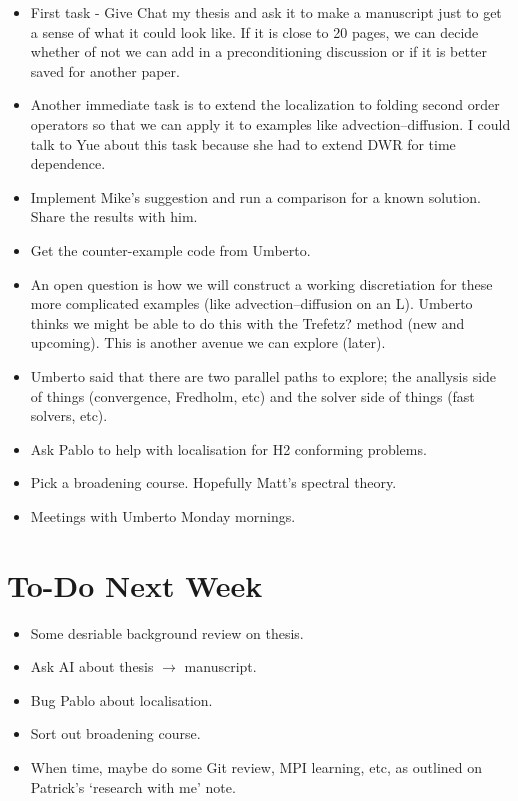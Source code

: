 \documentclass[12pt,a4paper]{article}
\begin{document}
\begin{itemize}
    \item First task - Give Chat my thesis and ask it to make a manuscript just to get a sense of what it could look like. If it is close to 20 pages, we can decide whether of not we can add in a preconditioning discussion or if it is better saved for another paper. 
    \item Another immediate task is to extend the localization to folding second order operators so that we can apply it to examples like advection--diffusion. I could talk to Yue about this task because she had to extend DWR for time dependence. 
    \item Implement Mike's suggestion and run a comparison for a known solution. Share the results with him. 
    \item Get the counter-example code from Umberto.
    \item An open question is how we will construct a working discretiation for these more complicated examples (like advection--diffusion on an L). Umberto thinks we might be able to do this with the Trefetz? method (new and upcoming). This is another avenue we can explore (later). 
    \item Umberto said that there are two parallel paths to explore; the anallysis side of things (convergence, Fredholm, etc) and the solver side of things (fast solvers, etc). 
    \item Ask Pablo to help with localisation for H2 conforming problems. 
    \item Pick a broadening course. Hopefully Matt's spectral theory. 
    \item Meetings with Umberto Monday mornings. 
\end{itemize}


\section{To-Do Next Week}

\begin{itemize}
    \item Some desriable background review on thesis.
    \item Ask AI about thesis $\rightarrow$ manuscript.
    \item Bug Pablo about localisation. 
    \item Sort out broadening course. 
    \item When time, maybe do some Git review, MPI learning, etc, as outlined on Patrick's `research with me' note. 
\end{itemize}
\end{document}
